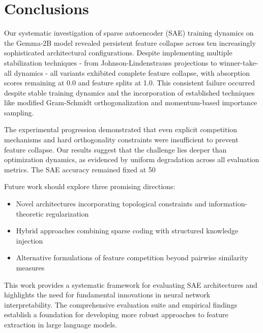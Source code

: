 \documentclass{article} %
\begin{document}
\section{Conclusions}
\label{sec:conclusion}

Our systematic investigation of sparse autoencoder (SAE) training dynamics on the Gemma-2B model revealed persistent feature collapse across ten increasingly sophisticated architectural configurations. Despite implementing multiple stabilization techniques - from Johnson-Lindenstrauss projections to winner-take-all dynamics - all variants exhibited complete feature collapse, with absorption scores remaining at 0.0 and feature splits at 1.0. This consistent failure occurred despite stable training dynamics and the incorporation of established techniques like modified Gram-Schmidt orthogonalization and momentum-based importance sampling.

The experimental progression demonstrated that even explicit competition mechanisms and hard orthogonality constraints were insufficient to prevent feature collapse. Our results suggest that the challenge lies deeper than optimization dynamics, as evidenced by uniform degradation across all evaluation metrics. The SAE accuracy remained fixed at 50%

Future work should explore three promising directions:
\begin{itemize}
    \item Novel architectures incorporating topological constraints and information-theoretic regularization
    \item Hybrid approaches combining sparse coding with structured knowledge injection
    \item Alternative formulations of feature competition beyond pairwise similarity measures
\end{itemize}

This work provides a systematic framework for evaluating SAE architectures and highlights the need for fundamental innovations in neural network interpretability. The comprehensive evaluation suite and empirical findings establish a foundation for developing more robust approaches to feature extraction in large language models.



\end{document}

